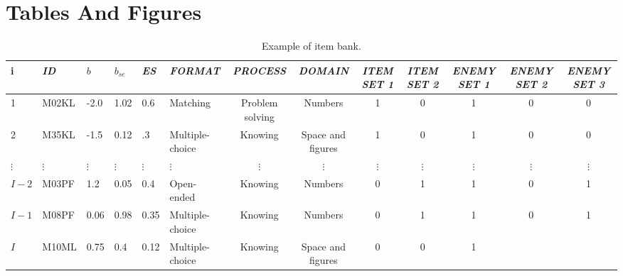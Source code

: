 
\chapter{Tables And Figures} %

\label{ch:TablesAndFigures} %
\begin{table}
	\scriptsize
	\centering \begin{tabular}{llllllccccccc}
		\hline
		i & \textsl{ID} & $b$ & $b_{se}$ & \textsl{ES} & \textsl{FORMAT} & \textsl{PROCESS} & \textsl{DOMAIN} & \textsl{ITEM SET 1} & \textsl{ITEM SET 2} & \textsl{ENEMY SET 1} & \textsl{ENEMY SET 2} & \textsl{ENEMY SET 3} \\ \hline
		1 & M02KL & -2.0 & 1.02 & 0.6& Matching & Problem solving & Numbers& 1 & 0 & 1 & 0 & 0 \\
		2 & M35KL & -1.5 & 0.12 & .3& Multiple-choice & Knowing & Space and figures & 1& 0& 1 & 0 & 0 \\
		$\vdots$ & $\vdots$ & $\vdots$ & $\vdots$ & $\vdots$ & $\vdots$ & $\vdots$ & $\vdots$ & $\vdots$ & $\vdots$ & $\vdots$ & $\vdots$ & $\vdots$ \\
		$I-2$ & M03PF & 1.2 & 0.05 & 0.4 & Open-ended & Knowing & Numbers & 0& 1& 1 & 0 & 1 \\
		$I-1$ & M08PF & 0.06 & 0.98 & 0.35 & Multiple-choice & Knowing & Numbers & 0& 1& 1 & 0 & 1 \\
		$I$ & M10ML & 0.75 & 0.4 & 0.12 & Multiple-choice & Knowing & Space and figures & 0 & 0 & 1
	\end{tabular}
	\caption{Example of item bank.\label{fig:tabitembank}}
\end{table}


